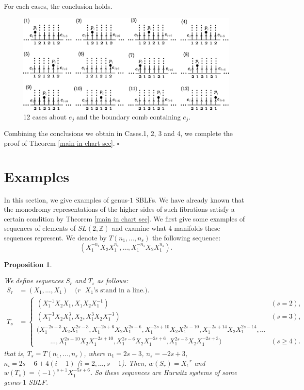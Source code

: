 \documentclass{amsart}
\theoremstyle{plain}
\newtheorem{prop}[thm]{Proposition}
\theoremstyle{definition}
\begin{document}
For each cases, the conclusion holds. 

\begin{figure}[h!]
\begin{center}
\includegraphics[width=150mm]{12cases.eps}
\end{center}
\caption{12 cases about $e_{j}$ and the boundary comb containing $e_{j}$. }
\label{12cases}
\end{figure}

Combining the conclusions we obtain in Cases.1, 2, 3 and 4, we complete the proof of Theorem \ref{main in chart sec}.  \hfill $\square$


\section{Examples}\label{examples}
In this section, we give examples of genus-$1$ SBLFs. 
We have already known that the monodromy representations of the higher sides of such fibrations satisfy a certain condition by Theorem \ref{main in chart sec}. 
We first give some examples of sequences of elements of $SL(2,\mathbb{Z})$ and examine what $4$-manifolds these sequences represent. 
We denote by $T(n_1,\ldots,n_s)$ the following sequence: 
\[
(X_1^{-n_1}X_2X_1^{n_1},\ldots,X_1^{-n_s}X_2X_1^{n_s}). 
\]

\begin{prop}\label{ex_seq}

We define sequences $S_r$ and $T_s$ as follows: 
\begin{align*}
S_r & =(X_1,\ldots,X_1) \hspace{1em}\text{($r$ $X_1$'s stand in a line.)}. \\
T_s & =\begin{cases}
(X_1^{-1}X_2X_1,X_1X_2X_1^{-1}) & (s=2), \\
(X_1^{-3}X_2X_1^{3},X_2,X_1^{3}X_2X_1^{-3}) & (s=3), \\
(X_1^{-2s+3}X_2X_1^{2s-3},X_1^{-2s+6}X_2X_1^{2s-6},X_1^{-2s+10}X_2X_1^{2s-10},X_1^{-2s+14}X_2X_1^{2s-14},\ldots \\
 \hspace{2em}\ldots ,X_1^{2s-10}X_2X_1^{-2s+10},X_1^{2s-6}X_2X_1^{-2s+6},X_1^{2s-3}X_2X_1^{-2s+3}) & (s\geq 4). 
\end{cases}
\end{align*}
that is, $T_s=T(n_1,\ldots,n_s)$, where $n_1=2s-3$, $n_s=-2s+3$, $n_i=2s-6+4(i-1)$ ($i=2,\ldots,s-1$). 
Then, $w(S_r)={X_1}^r$ and $w(T_s)=(-1)^{s+1}X_1^{-5s+6}$. 
So these sequences are Hurwitz systems of some genus-$1$ SBLF. 

\end{prop}
\end{document}
